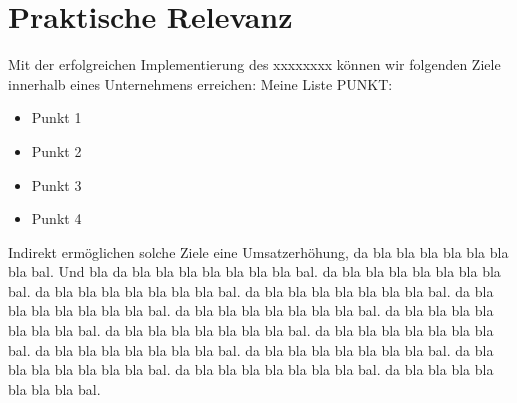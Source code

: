 \section{Praktische Relevanz}


Mit der erfolgreichen Implementierung des xxxxxxxx können wir folgenden Ziele innerhalb eines Unternehmens erreichen:
Meine Liste PUNKT:
\begin{itemize}
    \item Punkt 1
    \item Punkt 2
    \item Punkt 3
    \item Punkt 4
\end{itemize}

Indirekt ermöglichen solche Ziele eine Umsatzerhöhung, da bla bla bla bla bla bla bla bal. 
Und bla da bla bla bla bla bla bla bla bal. da bla bla bla bla bla bla bla bal. da bla bla bla bla bla bla bla bal. 
da bla bla bla bla bla bla bla bal. da bla bla bla bla bla bla bla bal. da bla bla bla bla bla bla bla bal. 
da bla bla bla bla bla bla bla bal. da bla bla bla bla bla bla bla bal. da bla bla bla bla bla bla bla bal. 
da bla bla bla bla bla bla bla bal. da bla bla bla bla bla bla bla bal. da bla bla bla bla bla bla bla bal. 
da bla bla bla bla bla bla bla bal. da bla bla bla bla bla bla bla bal. 